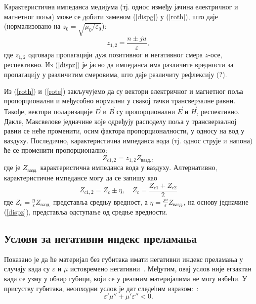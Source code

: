 \documentclass[main.tex]{subfiles}
\begin{document}
Карактеристична импеданса медијума (тј. однос између јачина електричног и магнетног поља) може се добити заменом (\ref{dispg}) у (\ref{roth}), што даје (нормализовано на $z_0=\sqrt{\mu_0 / \varepsilon_0}$):
\begin{equation}\label{dispz}
z_{1,2} = \frac{n\pm ju}{\varepsilon},
\end{equation}
где $z_{1,2}$ одговара пропагацији дуж позитивног и негативног смера $z$-осе, респективно. Из (\ref{dispz}) је јасно да импеданса има различите вредности за пропагацију у различитим смеровима, што даје различиту рефлексију (?).

Из (\ref{roth}) и (\ref{rote}) закључујемо да су вектори електричног и магнетног поља пропорционални и међусобно нормални у свакој тачки трансверзалне равни. Такође, вектори поларизације $\vec{D}$ и $\vec{B}$ су пропорционални $\vec{E}$ и $\vec{H}$, респективно. Дакле, Максвелове једначине које одређују расподелу поља у трансверзалној равни се неће променити, осим фактора пропорционалности, у односу на вод у ваздуху. Последично, карактеристична импеданса вода (тј. однос струје и напона) ће се променити пропорционално:
\begin{equation}
Z_{c1,2} = z_{1,2}Z_{вазд.},
\end{equation}
где је $Z_{вазд.}$ карактеристична импеданса вода у ваздуху. Алтернативно, карактеристичне импедансе могу да се запишу као
\begin{equation}\label{zceta}
Z_{c1,2} = Z_c \pm \eta,\quad Z_c = \frac{Z_{c1}+Z_{c2}}{2}
\end{equation}
где $Z_c = \frac{n}{\varepsilon} Z_{вазд.}$ представља средњу вредност, а $\eta = \frac{ju}{\varepsilon} Z_{вазд.}$, на основу једначине (\ref{dispz}), представља одступање од средње вредности.%

\subsection{Услови за негативни индекс преламања}

Показано је да ће материјал без губитака имати негативни индекс преламања у случају када су $\varepsilon$ и $\mu$ истовремено негативни~\cite{veselago_cir}. Међутим, овај услов није егзактан када се узму у обзир губици, који се у реалним материјалима не могу избећи. У присуству губитака, неопходни услов је дат следећим изразом:~\cite{mccall,mccall2}:
\begin{equation}\label{usl_std}
\varepsilon'\mu''+\mu'\varepsilon'' < 0.
\end{equation}
\end{document}
